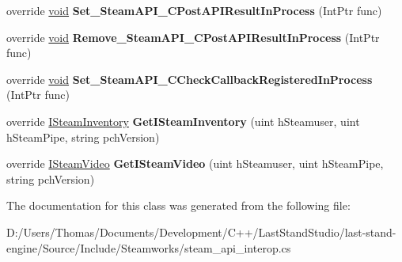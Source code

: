 \begin{DoxyCompactItemize}
\item 
\hypertarget{classValve_1_1Steamworks_1_1CSteamClient_a424cf8284bcae171c7ee42b054f7e435}{}override \hyperlink{SDL__audio_8h_a52835ae37c4bb905b903cbaf5d04b05f}{void} {\bfseries Set\+\_\+\+Steam\+A\+P\+I\+\_\+\+C\+Post\+A\+P\+I\+Result\+In\+Process} (Int\+Ptr func)\label{classValve_1_1Steamworks_1_1CSteamClient_a424cf8284bcae171c7ee42b054f7e435}

\item 
\hypertarget{classValve_1_1Steamworks_1_1CSteamClient_af45b32f8f7dd6eac95f2a004afa247b3}{}override \hyperlink{SDL__audio_8h_a52835ae37c4bb905b903cbaf5d04b05f}{void} {\bfseries Remove\+\_\+\+Steam\+A\+P\+I\+\_\+\+C\+Post\+A\+P\+I\+Result\+In\+Process} (Int\+Ptr func)\label{classValve_1_1Steamworks_1_1CSteamClient_af45b32f8f7dd6eac95f2a004afa247b3}

\item 
\hypertarget{classValve_1_1Steamworks_1_1CSteamClient_a741bc111f6426ba9a2028228eb112d4d}{}override \hyperlink{SDL__audio_8h_a52835ae37c4bb905b903cbaf5d04b05f}{void} {\bfseries Set\+\_\+\+Steam\+A\+P\+I\+\_\+\+C\+Check\+Callback\+Registered\+In\+Process} (Int\+Ptr func)\label{classValve_1_1Steamworks_1_1CSteamClient_a741bc111f6426ba9a2028228eb112d4d}

\item 
\hypertarget{classValve_1_1Steamworks_1_1CSteamClient_a0b92cec7a4163f19b73694216c80b90e}{}override \hyperlink{classValve_1_1Steamworks_1_1ISteamInventory}{I\+Steam\+Inventory} {\bfseries Get\+I\+Steam\+Inventory} (uint h\+Steamuser, uint h\+Steam\+Pipe, string pch\+Version)\label{classValve_1_1Steamworks_1_1CSteamClient_a0b92cec7a4163f19b73694216c80b90e}

\item 
\hypertarget{classValve_1_1Steamworks_1_1CSteamClient_af2563c5d6504e680d8585bce72d2f365}{}override \hyperlink{classValve_1_1Steamworks_1_1ISteamVideo}{I\+Steam\+Video} {\bfseries Get\+I\+Steam\+Video} (uint h\+Steamuser, uint h\+Steam\+Pipe, string pch\+Version)\label{classValve_1_1Steamworks_1_1CSteamClient_af2563c5d6504e680d8585bce72d2f365}

\end{DoxyCompactItemize}


The documentation for this class was generated from the following file\+:\begin{DoxyCompactItemize}
\item 
D\+:/\+Users/\+Thomas/\+Documents/\+Development/\+C++/\+Last\+Stand\+Studio/last-\/stand-\/engine/\+Source/\+Include/\+Steamworks/steam\+\_\+api\+\_\+interop.\+cs\end{DoxyCompactItemize}
